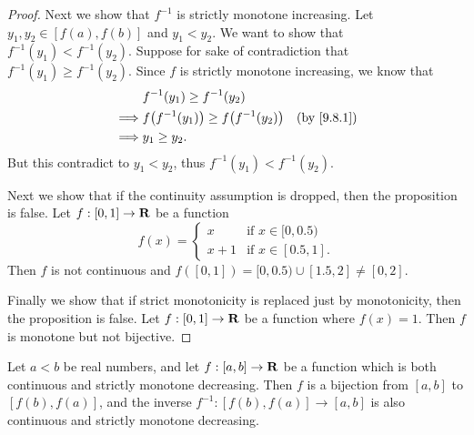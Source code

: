 \begin{proof}
  Next we show that \(f^{-1}\) is strictly monotone increasing.
  Let \(y_1, y_2 \in [f(a), f(b)]\) and \(y_1 < y_2\).
  We want to show that \(f^{-1}(y_1) < f^{-1}(y_2)\).
  Suppose for sake of contradiction that \(f^{-1}(y_1) \geq f^{-1}(y_2)\).
  Since \(f\) is strictly monotone increasing, we know that
  \begin{align*}
             & f^{-1}(y_1) \geq f^{-1}(y_2)                                                  \\
    \implies & f\big(f^{-1}(y_1)\big) \geq f\big(f^{-1}(y_2)\big) & \text{(by \cref{9.8.1})} \\
    \implies & y_1 \geq y_2.
  \end{align*}
  But this contradict to \(y_1 < y_2\), thus \(f^{-1}(y_1) < f^{-1}(y_2)\).

  Next we show that if the continuity assumption is dropped, then the proposition is false.
  Let \(f : [0, 1] \to \mathbf{R}\) be a function
  \[
    f(x) = \begin{cases}
      x     & \text{if } x \in [0, 0.5)  \\
      x + 1 & \text{if } x \in [0.5, 1].
    \end{cases}
  \]
  Then \(f\) is not continuous and \(f([0, 1]) = [0, 0.5) \cup [1.5, 2] \neq [0, 2]\).

  Finally we show that if strict monotonicity is replaced just by monotonicity, then the proposition is false.
  Let \(f : [0, 1] \to \mathbf{R}\) be a function where \(f(x) = 1\).
  Then \(f\) is monotone but not bijective.
\end{proof}

\begin{additional corollary}\label{ac 9.8.1}
Let \(a < b\) be real numbers, and let \(f : [a, b] \to \mathbf{R}\) be a function which is both continuous and strictly monotone decreasing.
Then \(f\) is a bijection from \([a, b]\) to \([f(b), f(a)]\), and the inverse \(f^{-1} : [f(b), f(a)] \to [a, b]\) is also continuous and strictly monotone decreasing.
\end{additional corollary}

